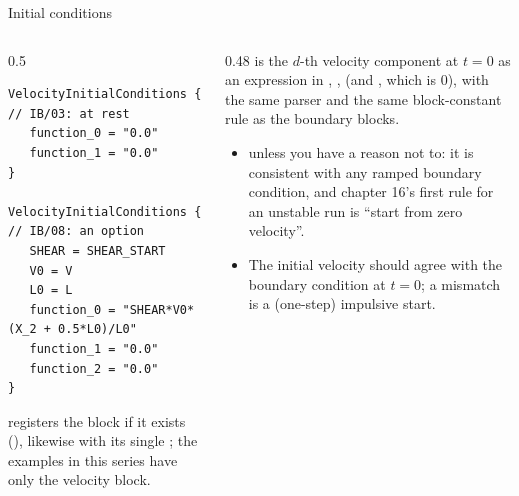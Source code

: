 \documentclass[aspectratio=169,11pt]{beamer}
\begin{document}
\begin{frame}[fragile]{Initial conditions}
\label{fr:ic}
\begin{columns}[T,onlytextwidth]
\begin{column}{0.5\textwidth}
\begin{lstlisting}[style=inputtiny]
VelocityInitialConditions {        // IB/03: at rest
   function_0 = "0.0"
   function_1 = "0.0"
}

VelocityInitialConditions {        // IB/08: an option
   SHEAR = SHEAR_START
   V0 = V
   L0 = L
   function_0 = "SHEAR*V0*(X_2 + 0.5*L0)/L0"
   function_1 = "0.0"
   function_2 = "0.0"
}
\end{lstlisting}
\footnotesize {} registers the block if it exists (), likewise  with its single ; the examples in this series have only the velocity block.
\end{column}
\begin{column}{0.48\textwidth}
\small {} is the $d$-th velocity component at $t = 0$ as an expression in , ,  (and , which is $0$), with the same parser and the same block-constant rule as the boundary blocks.
\begin{itemize}
  \item {} unless you have a reason not to: it is consistent with any ramped boundary condition, and chapter 16's first rule for an unstable run is ``start from zero velocity''.
  \item The initial velocity should agree with the boundary condition at $t = 0$; a mismatch is a (one-step) impulsive start.
\end{itemize}
\end{column}
\end{columns}
\end{frame}
\end{document}

